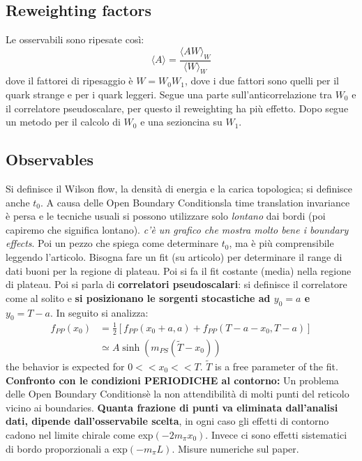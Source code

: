 \documentclass[12pt,a4paper,openright]{article}
\newcommand{\la}{\langle}
\newcommand{\ra}{\rangle}
\newcommand{\colg}{\textcolor{PineGreen}}
\newcommand{\obc}{Open Boundary Conditions}
\begin{document}
\subsection{Reweighting factors}
Le osservabili sono ripesate così:
\begin{equation*}
  \la A \ra = \frac{\la AW \ra_W}{\la W \ra_W}
\end{equation*}
dove il fattorei di ripesaggio è $W = W_0W_1$, dove i due fattori sono quelli per il quark strange e per i quark leggeri.
\newline
Segue una parte sull'anticorrelazione tra $W_0$ e il correlatore pseudoscalare, per questo il reweighting ha più effetto.
Dopo segue un metodo per il calcolo di $W_0$ e una sezioncina su $W_1$.
\subsection{Observables}
Si definisce il Wilson flow, la densità di energia e la carica topologica; si definisce anche $t_0$.
A causa delle \obc la time translation invariance è persa e le tecniche usuali si possono utilizzare solo {\it lontano} dai bordi (poi capiremo che significa lontano).
\colg{\it c'è un grafico che mostra molto bene i boundary effects}.
\newline
Poi un pezzo che spiega come determinare $t_0$, ma è più comprensibile leggendo l'articolo.
Bisogna fare un fit (su articolo) per determinare il range di dati buoni per la regione di plateau. Poi si fa il fit costante (media) nella regione di plateau.
\newline
Poi si parla di {\bf correlatori pseudoscalari}: si definisce il correlatore come al solito e \colg{\bf si posizionano le sorgenti stocastiche ad $y_0 = a$ e $y_0 = T-a$}.
In seguito si analizza:
\begin{equation}
  \begin{aligned}
    f_{PP}(x_0) & = \frac{1}{2}\left[ f_{PP}(x_0 +a, a) + f_{PP}(T-a-x_0,T- a) \right] \\
                & \simeq A \sinh\left(m_{PS}(\tilde{T}-x_0)\right)
  \end{aligned}
\end{equation}
the behavior is expected for $0 << x_0 << T$. $\tilde{T}$ is a free parameter of the fit.
\newline
\newline
{\bf Confronto con le condizioni PERIODICHE al contorno:}\newline
Un problema delle \obc è la non attendibilità di molti punti del reticolo vicino ai boundaries.
\colg{\bf Quanta frazione di punti va eliminata dall'analisi dati, dipende dall'osservabile scelta}, in ogni caso gli effetti di contorno cadono nel limite chirale come exp$\left( -2m_\pi x_0\right)$.
Invece ci sono effetti sistematici di bordo proporzionali a exp$(-m_\pi L)$. Misure numeriche sul paper.
\end{document}
